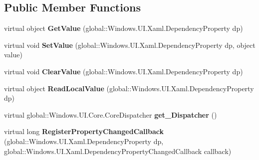 \subsection*{Public Member Functions}
\begin{DoxyCompactItemize}
\item 
\mbox{\label{class_windows_1_1_u_i_1_1_xaml_1_1_dependency_object_ab7542d3826e3529750a867a66f41f33f}} 
virtual object {\bfseries Get\+Value} (global\+::\+Windows.\+U\+I.\+Xaml.\+Dependency\+Property dp)
\item 
\mbox{\label{class_windows_1_1_u_i_1_1_xaml_1_1_dependency_object_afbd5da79518b87e7eda7210ee248e8e2}} 
virtual void {\bfseries Set\+Value} (global\+::\+Windows.\+U\+I.\+Xaml.\+Dependency\+Property dp, object value)
\item 
\mbox{\label{class_windows_1_1_u_i_1_1_xaml_1_1_dependency_object_aae39f9b4dad56dfde575dd48bed82cd3}} 
virtual void {\bfseries Clear\+Value} (global\+::\+Windows.\+U\+I.\+Xaml.\+Dependency\+Property dp)
\item 
\mbox{\label{class_windows_1_1_u_i_1_1_xaml_1_1_dependency_object_adc36478eb501a1771f6d147333560730}} 
virtual object {\bfseries Read\+Local\+Value} (global\+::\+Windows.\+U\+I.\+Xaml.\+Dependency\+Property dp)
\item 
\mbox{\label{class_windows_1_1_u_i_1_1_xaml_1_1_dependency_object_a508c7b4f0ff4fbffc03e3c15071bccad}} 
virtual global\+::\+Windows.\+U\+I.\+Core.\+Core\+Dispatcher {\bfseries get\+\_\+\+Dispatcher} ()
\item 
\mbox{\label{class_windows_1_1_u_i_1_1_xaml_1_1_dependency_object_ab58e52b043959b48f59e0631b15126f7}} 
virtual long {\bfseries Register\+Property\+Changed\+Callback} (global\+::\+Windows.\+U\+I.\+Xaml.\+Dependency\+Property dp, global\+::\+Windows.\+U\+I.\+Xaml.\+Dependency\+Property\+Changed\+Callback callback)
\item 
\mbox{\label{class_windows_1_1_u_i_1_1_xaml_1_1_dependency_object_a1038375289633f64b7f560eb26de036f}} 

\end{DoxyCompactItemize}
